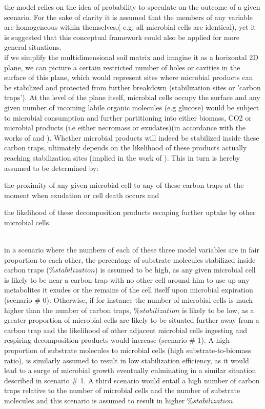 	the model relies  on the idea of probability to speculate on the outcome of a given scenario.
	For the sake of clarity it is assumed that the members of any variable are homogeneous within themselves,( e.g. all microbial cells are identical), yet it is suggested that this conceptual framework could also be applied for more general situations.\\
	if we simplify the multidimensional soil matrix and imagine it as a horizontal 2D plane, we can picture a certain restricted number of holes or cavities in the surface of this plane, which would represent sites where microbial products can be stabilized and protected from further breakdown (stabilization sites or 'carbon traps'). At the level of the plane itself, microbial cells occupy the surface and any given number of incoming labile organic molecules (e.g glucose) would be subject to microbial consumption and further partitioning into either biomass, CO2 or microbial products (i.e either necromass or exudates)(in accordance with the works of \citeauthor{fischer2010} and \citeauthor{gunina2014}). Whether microbial products will indeed be stabilized inside these carbon traps, ultimately depends on the likelihood of these products actually reaching stabilization sites (implied in the work of \citeauthor{kravchenko2015}). This in turn is hereby assumed to be determined by:
	\begin{enumerate*}[label=(\arabic*)]
		\item the proximity of any given microbial cell to any of these carbon traps at the moment when exudation or cell death occurs and
		\item the likelihood of these decomposition products escaping further uptake by other microbial cells.
	\end{enumerate*}\\
	 in a scenario where the numbers of each of these three model variables are in fair proportion to each other, the percentage of substrate molecules stabilized inside carbon traps ($ \%stabilization $) is assumed to be high, as any given microbial cell is likely to be near a carbon trap with no other cell around him to use up any metabolites it exudes or the remains of the cell itself upon microbial expiration (scenario \# 0). Otherwise, if for instance the number of microbial cells is much higher than the number of carbon traps, $ \%stabilization  $ is likely to be low, as a greater proportion of microbial cells are likely to be situated further away from a carbon trap and the likelihood of other adjacent microbial cells ingesting and respiring decomposition products would increase (scenario \# 1). A high proportion of substrate molecules to microbial cells (high substrate-to-biomass ratio),  is similarly assumed to result in low stabilization efficiency, as it would lead to a surge  of microbial growth eventually culminating in a similar situation described in scenario \# 1. A third scenario would entail a high number of carbon traps relative to the number of microbial cells and the number of substrate molecules and this scenario is assumed to result in higher $ \%stabilization $.\\
